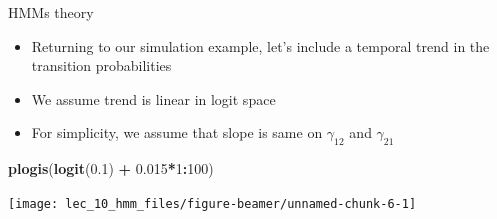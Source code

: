 \documentclass[
  ignorenonframetext,
]{beamer}
\newenvironment{Shaded}{\begin{snugshade}}{\end{snugshade}}
\newcommand{\DecValTok}[1]{\textcolor[rgb]{0.00,0.00,0.81}{#1}}
\newcommand{\FloatTok}[1]{\textcolor[rgb]{0.00,0.00,0.81}{#1}}
\newcommand{\KeywordTok}[1]{\textcolor[rgb]{0.13,0.29,0.53}{\textbf{#1}}}
\newcommand{\NormalTok}[1]{#1}
\newcommand{\OperatorTok}[1]{\textcolor[rgb]{0.81,0.36,0.00}{\textbf{#1}}}
\newcommand{\StringTok}[1]{\textcolor[rgb]{0.31,0.60,0.02}{#1}}
\providecommand{\tightlist}{%
  \setlength{\itemsep}{0pt}\setlength{\parskip}{0pt}}
\begin{document}
\begin{frame}[fragile]{HMMs theory}
\protect\hypertarget{hmms-theory-2}{}

\begin{itemize}
\tightlist
\item
  Returning to our simulation example, let's include a temporal trend in
  the transition probabilities
\item
  We assume trend is linear in logit space
\item
  For simplicity, we assume that slope is same on \({ \gamma }_{ 12 }\)
  and \({ \gamma }_{ 21 }\)
\end{itemize}

\begin{Shaded}
\begin{Highlighting}[]
\KeywordTok{plogis}\NormalTok{(}\KeywordTok{logit}\NormalTok{(}\FloatTok{0.1}\NormalTok{) }\OperatorTok{+}\StringTok{ }\FloatTok{0.015}\OperatorTok{*}\DecValTok{1}\OperatorTok{:}\DecValTok{100}\NormalTok{)}
\end{Highlighting}
\end{Shaded}

\begin{center}\texttt{[image: lec\_10\_hmm\_files/figure-beamer/unnamed-chunk-6-1]} \end{center}

\end{frame}
\end{document}
